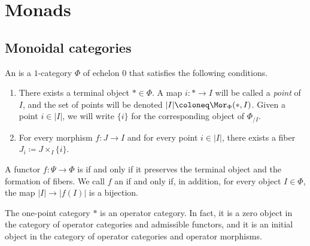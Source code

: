 
\section{Monads}%
\label{sec:monads}

\subsection{Monoidal categories}%
\label{sub:monoidal_categories}

\begin{definition}
	An  is a $1$-category $ \Phi $
	of echelon $ 0 $
	that satisfies the following conditions.
	\begin{enumerate}
		\item There exists a terminal object $ \ast \in \Phi $.
			A map $ i \colon \ast \to I $ will be called
			a \emph{point} of $ I $, and
			the set of points will be denoted
			$ |I| \coloneq \Mor_{\Phi}(\ast, I) $.
			Given a point $ i \in |I| $, we will write
			$ \{ i \} $ for the corresponding object of $ \Phi_{/I} $.
		\item For every morphism $ f \colon J \to I $ and
			for every point $ i \in |I| $,
			there exists a fiber $ J_i \coloneq J \times_I \{i\} $.
	\end{enumerate}
	
	A functor $ f \colon \Psi \to \Phi $ is  if and only if
	it preserves the terminal object and the formation of fibers.
	We call $ f $ an 
	if and only if, in addition,
	for every object $ I \in \Phi $,
	the map $ |I| \to |f(I)| $ is a bijection.
\end{definition}

\begin{eg}
	The one-point category $ \ast $ is an operator category.
	In fact, it is a zero object in
	the category of operator categories and admissible functors,
	and it is an initial object in
	the category of operator categories and operator morphisms.
\end{eg}

